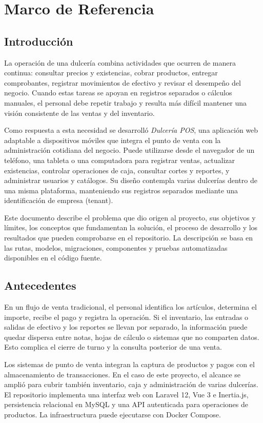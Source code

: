 \chapter{Marco de Referencia}

\section{Introducción}

La operación de una dulcería combina actividades que ocurren de manera continua: consultar precios y existencias, cobrar productos, entregar comprobantes, registrar movimientos de efectivo y revisar el desempeño del negocio. Cuando estas tareas se apoyan en registros separados o cálculos manuales, el personal debe repetir trabajo y resulta más difícil mantener una visión consistente de las ventas y del inventario.

Como respuesta a esta necesidad se desarrolló \textit{Dulcería POS}, una aplicación web adaptable a dispositivos móviles que integra el punto de venta con la administración cotidiana del negocio. Puede utilizarse desde el navegador de un teléfono, una tableta o una computadora para registrar ventas, actualizar existencias, controlar operaciones de caja, consultar cortes y reportes, y administrar usuarios y catálogos. Su diseño contempla varias dulcerías dentro de una misma plataforma, manteniendo sus registros separados mediante una identificación de empresa (tenant).

Este documento describe el problema que dio origen al proyecto, sus objetivos y límites, los conceptos que fundamentan la solución, el proceso de desarrollo y los resultados que pueden comprobarse en el repositorio. La descripción se basa en las rutas, modelos, migraciones, componentes y pruebas automatizadas disponibles en el código fuente.

\section{Antecedentes}

En un flujo de venta tradicional, el personal identifica los artículos, determina el importe, recibe el pago y registra la operación. Si el inventario, las entradas o salidas de efectivo y los reportes se llevan por separado, la información puede quedar dispersa entre notas, hojas de cálculo o sistemas que no comparten datos. Esto complica el cierre de turno y la consulta posterior de una venta.

Los sistemas de punto de venta integran la captura de productos y pagos con el almacenamiento de transacciones. En el caso de este proyecto, el alcance se amplió para cubrir también inventario, caja y administración de varias dulcerías. El repositorio implementa una interfaz web con Laravel 12, Vue 3 e Inertia.js, persistencia relacional en MySQL y una API autenticada para operaciones de productos. La infraestructura puede ejecutarse con Docker Compose.

